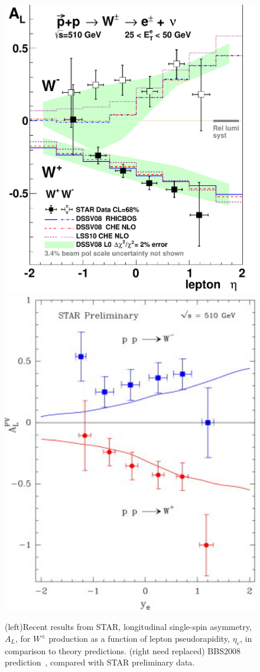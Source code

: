 \begin{figure} [htbp]
  \centering
    \includegraphics[width=0.50\linewidth]{figs_xj/STAR-WAL_2012.pdf}
    \includegraphics[width=0.47\linewidth]{figs_xj/BBS2008_STAR_Wpreliminary.pdf} \\
  \caption{\label{fig:STAR_W} (left)Recent results from STAR,  longitudinal single-spin asymmetry, $A_L$, for $W^\pm$ production as a function of lepton pseudorapidity, $\eta_e$, in comparison to theory predictions. (right need replaced) BBS2008 prediction~\cite{Bourrely2013296}, compared with STAR preliminary data. }
\end{figure}

